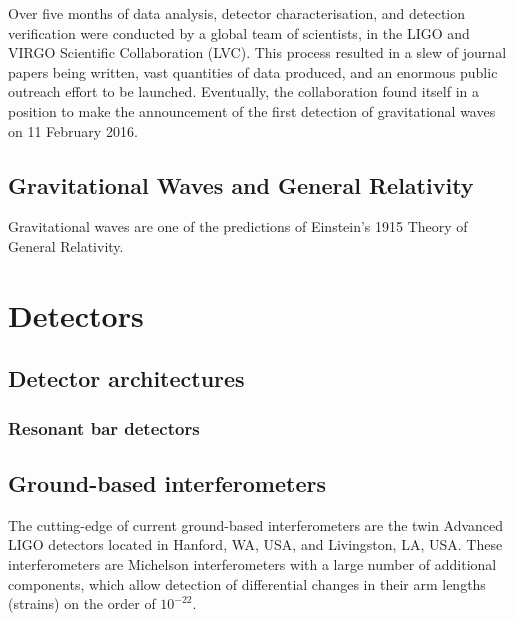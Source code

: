 \documentclass{kentigern}
\begin{document}
Over five months of data analysis, detector characterisation, and
detection verification were conducted by a global team of scientists,
in the LIGO and VIRGO Scientific Collaboration (LVC). This process
resulted in a slew of journal papers being written, vast quantities of
data produced, and an enormous public outreach effort to be
launched. Eventually, the collaboration found itself in a position to
make the announcement of the first detection of gravitational waves on
11 February 2016.


\section{Gravitational Waves and General Relativity}
\label{sec:grav-waves-gener}

Gravitational waves are one of the predictions of Einstein's 1915
Theory of General Relativity.

\chapter{Detectors}
\label{cha:detectors}




\section{Detector architectures}
\label{sec:detect-arch}

\subsection{Resonant bar detectors}
\label{sec:reson-bar-detect}

\section{Ground-based interferometers}
\label{sec:ground-based-interf}

The cutting-edge of current ground-based interferometers are the twin
Advanced LIGO detectors \cite{2015CQGra..32g4001L} located in Hanford,
WA, USA, and Livingston, LA, USA. These interferometers are Michelson
interferometers with a large number of additional components, which
allow detection of differential changes in their arm lengths (strains)
on the order of $10^{-22}$.
\end{document}
